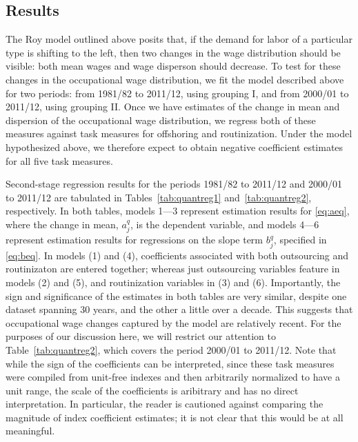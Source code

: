 \subsection{Results}

The Roy model outlined above posits that, if the demand for labor of a particular type is shifting to the left, then two changes in the wage distribution should be visible: both mean wages and wage disperson should decrease. To test for these changes in the occupational wage distribution, we fit the model described above for two periods: from 1981/82 to 2011/12, using grouping I, and from 2000/01 to 2011/12, using grouping II. Once we have estimates of the change in mean and dispersion of the occupational wage distribution, we regress both of these measures against task measures for offshoring and routinization. Under the model hypothesized above, we therefore expect to obtain negative coefficient estimates for all five task measures.

Second-stage regression results for the periods 1981/82 to 2011/12 and 2000/01 to 2011/12 are tabulated in Tables~\ref{tab:quantreg1} and~\ref{tab:quantreg2}, respectively. In both tables, models 1---3 represent estimation results for \eqref{eq:aeq}, where the change in mean, $a_j^q$, is the dependent variable, and models 4---6 represent estimation results for regressions on the slope term $b_j^q$, specified in \eqref{eq:beq}. In models (1) and (4), coefficients associated with both outsourcing and routinizaton are entered together; whereas just outsourcing variables feature in models (2) and (5), and routinization variables in (3) and (6). Importantly, the sign and significance of the estimates in both tables are very similar, despite one dataset spanning 30 years, and the other a little over a decade. This suggests that occupational wage changes captured by the model are relatively recent. For the purposes of our discussion here, we will restrict our attention to Table~\ref{tab:quantreg2}, which covers the period 2000/01 to 2011/12. Note that while the sign of the coefficients can be interpreted, since these task measures were compiled from unit-free indexes and then arbitrarily normalized to have a unit range, the scale of the coefficients is aribitrary and has no direct interpretation. In particular, the reader is cautioned against comparing the magnitude of index coefficient estimates; it is not clear that this would be at all meaningful.





